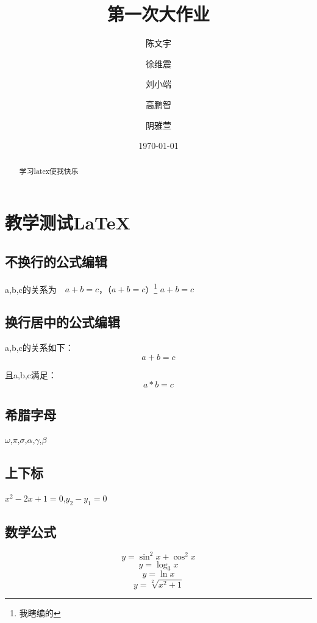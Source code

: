 \documentclass{article}
\title{第一次大作业}
\author{陈文宇
	\and 徐维震
	\and 刘小端
	\and 高鹏智
	\and 阴雅萱}
\date{\today}
\begin{document}
	\maketitle
	\begin{titlepage}
		\begin{abstract}
			学习latex使我快乐
		\end{abstract}
	\end{titlepage}

	
	\newpage
	\tableofcontents 	%
	\listoftables		%
	\listoffigures		%
	\newpage
	\section[教学测试]{教学测试\LaTeX}
	
	\subsection{不换行的公式编辑}
	a,b,c的关系为~\ $ a + b  = c $，（\(a + b = c\)）\footnote{我瞎编的} %
	\begin{math} 
		a + b = c 
	\end{math}	
	
	\subsection{换行居中的公式编辑}
	
	a,b,c的关系如下：
	$$ a + b =c $$
	
	
	且a,b,c满足：
	\[a * b = c\]
	
	\subsection{希腊字母}
	$\omega$,$\pi$,$\sigma$,$\alpha$,$\gamma$,$\beta$%

	\subsection{上下标}
	$x^2 - 2x + 1 = 0 $,$y_2 - y_1=0$ %
	
	\subsection{数学公式}
	
	$$ y=\sin^2 x+\cos^2 x $$ \label{eq:firsteq}
	$$ y=\log_3 x $$ 
	$$ y=\ln x $$ 
	$$ y=\sqrt[2]{x^2 +1} $$ 
	
\end{document}
